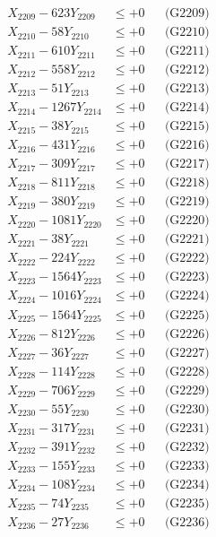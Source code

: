 \documentclass[a4paper,10pt]{article}
\begin{document}
{\begin{align}
X_{2209} - 623Y_{2209} &\leq +0 && \text{(G2209)} \\
X_{2210} - 58Y_{2210} &\leq +0 && \text{(G2210)} \\
\allowbreak
X_{2211} - 610Y_{2211} &\leq +0 && \text{(G2211)} \\
X_{2212} - 558Y_{2212} &\leq +0 && \text{(G2212)} \\
X_{2213} - 51Y_{2213} &\leq +0 && \text{(G2213)} \\
X_{2214} - 1267Y_{2214} &\leq +0 && \text{(G2214)} \\
X_{2215} - 38Y_{2215} &\leq +0 && \text{(G2215)} \\
X_{2216} - 431Y_{2216} &\leq +0 && \text{(G2216)} \\
X_{2217} - 309Y_{2217} &\leq +0 && \text{(G2217)} \\
X_{2218} - 811Y_{2218} &\leq +0 && \text{(G2218)} \\
X_{2219} - 380Y_{2219} &\leq +0 && \text{(G2219)} \\
X_{2220} - 1081Y_{2220} &\leq +0 && \text{(G2220)} \\
\allowbreak
X_{2221} - 38Y_{2221} &\leq +0 && \text{(G2221)} \\
X_{2222} - 224Y_{2222} &\leq +0 && \text{(G2222)} \\
X_{2223} - 1564Y_{2223} &\leq +0 && \text{(G2223)} \\
X_{2224} - 1016Y_{2224} &\leq +0 && \text{(G2224)} \\
X_{2225} - 1564Y_{2225} &\leq +0 && \text{(G2225)} \\
X_{2226} - 812Y_{2226} &\leq +0 && \text{(G2226)} \\
X_{2227} - 36Y_{2227} &\leq +0 && \text{(G2227)} \\
X_{2228} - 114Y_{2228} &\leq +0 && \text{(G2228)} \\
X_{2229} - 706Y_{2229} &\leq +0 && \text{(G2229)} \\
X_{2230} - 55Y_{2230} &\leq +0 && \text{(G2230)} \\
\allowbreak
X_{2231} - 317Y_{2231} &\leq +0 && \text{(G2231)} \\
X_{2232} - 391Y_{2232} &\leq +0 && \text{(G2232)} \\
X_{2233} - 155Y_{2233} &\leq +0 && \text{(G2233)} \\
X_{2234} - 108Y_{2234} &\leq +0 && \text{(G2234)} \\
X_{2235} - 74Y_{2235} &\leq +0 && \text{(G2235)} \\
X_{2236} - 27Y_{2236} &\leq +0 && \text{(G2236)} \\

\end{align}}
\end{document}
